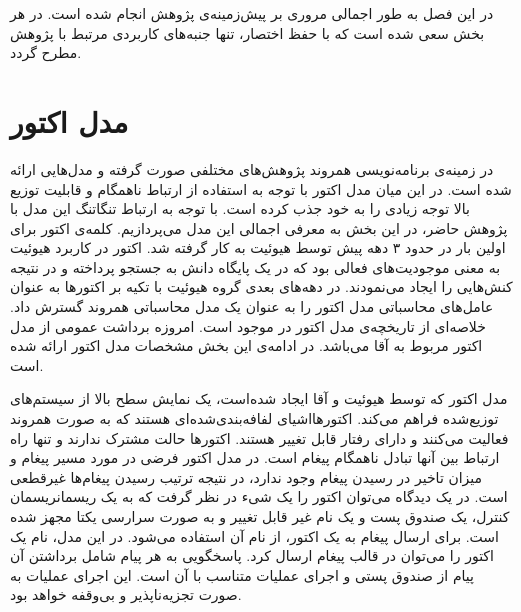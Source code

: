 در این فصل به طور اجمالی مروری بر پیش‌زمینه‌ی پژوهش انجام شده است. در هر بخش سعی شده است که با حفظ اختصار، تنها جنبه‌های  کاربردی مرتبط با پژوهش مطرح گردد.
\section{مدل اکتور}
\label{section:actorModel}

در زمینه‌ی برنامه‌نویسی همروند پژوهش‌های مختلفی صورت گرفته و مدل‌هایی ارائه شده است\cite{Briot98concurrencyand}. در این میان مدل \gls{اکتور} با توجه به استفاده از ارتباط ناهمگام و قابلیت توزیع بالا توجه زیادی را به خود جذب کرده است. با توجه به ارتباط تنگاتنگ این مدل با پژوهش حاضر، در این بخش به معرفی اجمالی این مدل می‌پردازیم.
کلمه‌ی اکتور برای اولین بار در حدود ۳ دهه پیش توسط هیوئیت  \cite{Hewitt1972} به کار گرفته شد. اکتور در کاربرد هیوئیت به معنی موجودیت‌های فعالی بود که در یک پایگاه دانش به جستجو پرداخته و در نتیجه کنش‌هایی را ایجاد می‌نمودند. در دهه‌های بعدی گروه هیوئیت با تکیه بر اکتورها به عنوان عامل‌های محاسباتی مدل اکتور را به عنوان یک مدل محاسباتی همروند گسترش داد. خلاصه‌ای از تاریخچه‌ی مدل اکتور در \cite{AghaMST97} موجود است. امروزه برداشت عمومی از مدل اکتور مربوط به  آقا\cite{Agha_86} می‌باشد. در ادامه‌ی این بخش مشخصات مدل اکتور ارائه شده است.
 
مدل اکتور که توسط هیوئیت و آقا \cite{Hewitt1972,Agha1987,Agha1990} ایجاد شده‌است، یک نمایش سطح بالا از سیستم‌های توزیع‌شده فراهم می‌کند. 
\gls{اکتور}هااشیای \gls{لفافه‌بندی‌شده}‌ای هستند که به صورت \gls{همروند} فعالیت می‌کنند و دارای \gls{رفتار} قابل تغییر هستند. 
اکتورها \gls{حالت  مشترک} ندارند و تنها راه ارتباط بین آنها تبادل ناهمگام پیغام است. 
 در مدل اکتور فرضی در مورد مسیر پیغام و میزان تاخیر در رسیدن پیغام وجود ندارد، در نتیجه ترتیب رسیدن پیغام‌ها \gls{غیرقطعی} است.
 در یک دیدگاه می‌توان اکتور را یک \gls{شی‌ء} در نظر گرفت که به یک ریسمان\gls{ریسمان} کنترل، یک صندوق پست و یک نام غیر قابل تغییر و به صورت سرارسی یکتا  مجهز شده است. برای ارسال پیغام به یک اکتور، از نام آن استفاده می‌شود. در این مدل، نام  یک اکتور را می‌توان در قالب پیغام  ارسال کرد. پاسخگویی به هر پیام شامل برداشتن آن پیام از صندوق پستی و اجرای عملیات متناسب با آن است.
این اجرای عملیات به صورت \gls{تجزیه‌ناپذیر} و بی‌وقفه خواهد بود\cite{Agha_86}.

